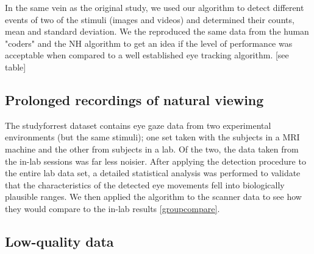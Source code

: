 In the same vein as the original study, we used our algorithm to detect different events of two of the stimuli (images and videos) and determined their counts, mean and standard deviation. We the reproduced the same data from the human "coders" and the NH algorithm \citep{Nystrom2010AnData} to get an idea if the level of performance was acceptable when compared to a well established eye tracking algorithm. [see table]  





\subsection*{Prolonged recordings of natural viewing}

The studyforrest dataset contains eye gaze data from two experimental environments (but the same stimuli); one set taken with the subjects in a MRI machine and the other from subjects in a lab. Of the two, the data taken from the in-lab sessions was far less noisier. After applying the detection procedure to the entire lab data set, a detailed statistical analysis was performed to validate that the characteristics of the detected eye movements fell into biologically plausible ranges. We then applied the algorithm to the scanner data to see how they would compare to the in-lab results \ref{groupcompare}. 

\subsection*{Low-quality data}

